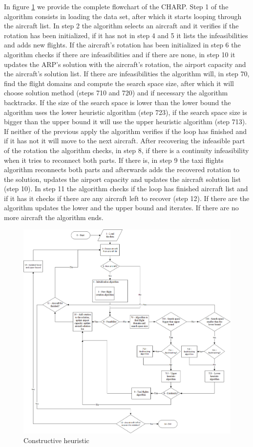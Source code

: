 In figure \ref{fig:mainAlgo} we provide the complete flowchart of the CHARP. Step 1 of the algorithm consists in loading the data set, after which it starts looping through the aircraft list. In step 2 the algorithm selects an aircraft and it verifies if the rotation has been initialized, if it has not in step 4 and 5 it lists the infeasibilities and adds new flights. If the aircraft's rotation has been initialized in step 6 the algorithm checks if there are infeasibilities and if there are none, in step 10 it updates the ARP's solution with the aircraft's rotation, the airport capacity and the aircraft's solution list. If there are infeasibilities the algorithm will, in step 70, find the flight domains and compute the search space size, after which it will choose solution method (steps 710 and 720) and if necessary the algorithm backtracks.
If the size of the search space is lower than the lower bound the algorithm uses the lower heuristic algorithm (step 723), if the search space size is bigger than the upper bound it will use the upper heuristic algorithm (step 713). If neither of the previous apply the algorithm verifies if the loop has finished and if it has not it will move to the next aircraft. After recovering the infeasible part of the rotation the algorithm checks, in step 8, if there is a continuity infeasibility when it tries to reconnect both parts. If there is, in step 9 the taxi flights algorithm reconnects both parts and afterwards adds the recovered rotation to the solution, updates the airport capacity and updates the aircraft solution list (step 10). In step 11  the algorithm checks if the loop has finished aircraft list and if it has it checks if there are any aircraft left to recover (step 12). If there are the algorithm updates the lower and the upper bound and iterates. If there are no more aircraft the algorithm ends.

 \begin{figure}[h!]
	\centering
	\includegraphics[scale=0.65]{figures/mainAlgo.png}
	\caption[]{Constructive heuristic}
	\label{fig:mainAlgo}
\end{figure}

%
